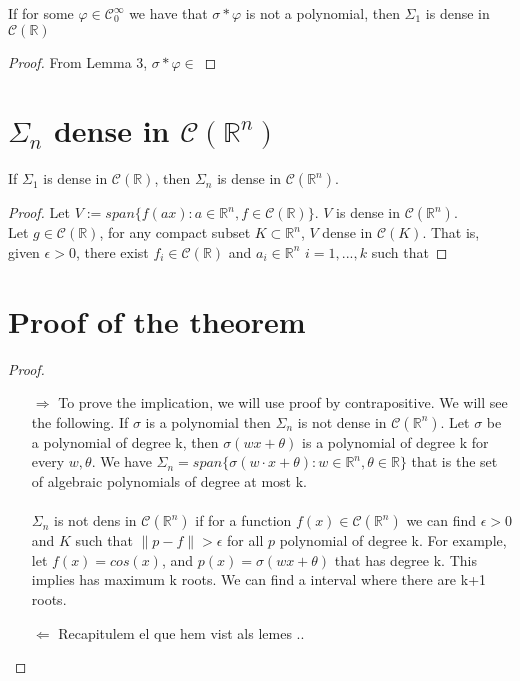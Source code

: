 \documentclass[../main.tex]{subfiles}
\begin{document}
	\begin{lema} %
		If for some $\varphi \in \mathcal{C}^\infty_0 $ we have that $\sigma \ast \varphi $ is not a polynomial, then $\Sigma_1$ is dense in $\mathcal{C}(\mathbb{R})$
	\end{lema}
	 \begin{proof}
	 From Lemma 3, $\sigma \ast \varphi \in$
	 \end{proof}
	 \section{{$\Sigma_n$ dense in $\mathcal{C}(\mathbb{R}^n)$}}
	\begin{lema}  %
			If $\Sigma_1$ is dense in $\mathcal{C}(\mathbb{R})$, then $\Sigma_n$ is dense in $\mathcal{C}(\mathbb{R}^n)$.
		\end{lema}
	
	\begin{proof} %
			Let $V:= span\{ f(ax) : a \in \mathbb{R}^n, f \in \mathcal{C}(\mathbb{R}) \}$. $V$ is dense in $\mathcal{C}(\mathbb{R}^n)$. \\ 
			Let $g\in \mathcal{C}(\mathbb{R}) $, for any compact subset $K \subset \mathbb{R}^n  $, $V$ dense in $\mathcal{C}(K)$. That is, given $\epsilon >0$, there exist $f_i\in  \mathcal{C}(\mathbb{R})$ and $a_i \in \mathbb{R}^n $    {\scriptsize $i=1,...,k$}  such that
		\end{proof}
	\section{Proof of the theorem}
	\begin{proof}~ %

	\begin{enumerate}
		\item[$\Rightarrow$] To prove the implication, we will use proof by contrapositive. We will see the following. If $\sigma$ is a polynomial then $\Sigma_n$ is not dense in $\mathcal{C}(\mathbb{R}^n)$. Let $\sigma$ be a polynomial of degree k, then $\sigma(wx+\theta)$ is a polynomial  of degree k for every $w,\theta$. We have $ \Sigma_n = span\{\sigma(w\cdot x + \theta) : w\in \mathbb{R}^n, \theta \in \mathbb{R} \}$ that is the set of algebraic polynomials of degree at most k. \\ \\ $\Sigma_n$ is not dens in $\mathcal{C}(\mathbb{R}^n)$ if for a function $f(x)\in \mathcal{C}(\mathbb{R}^n)$ we can find $\epsilon > 0$ and $K$ such that  $\| p-f \| > \epsilon$ for all $p$ polynomial of degree k. For example, let $f(x)=cos(x)$, and $p(x)= \sigma(wx+\theta)$ that has degree k. This implies has maximum k roots. We can find a interval where there are k+1 roots. 

		\item[$\Leftarrow$]  Recapitulem el que hem vist als lemes ..
	\end{enumerate}
\end{proof}
	\cite{leshno1993multilayer}
\end{document}
